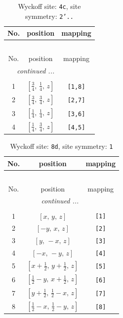 \documentclass[fleqn,8pt]{jsarticle}
\begin{document}
\begin{longtable}{ccc}
\caption{Wyckoff site: {\tt 4c}, site symmetry: {\tt 2'..}}
 \\
 \hline \hline
No. & position & mapping \\ \hline \endfirsthead

\multicolumn{2}{l}{\tablename\ \thetable{}} \\
 \hline \hline
No. & position & mapping \\ \hline \endhead

 \hline \hline
\multicolumn{2}{r}{\footnotesize\it continued ...} \\ \endfoot

 \hline \hline
\multicolumn{2}{r}{} \\ \endlastfoot

1 & $\left[ \frac{3}{4},\, \frac{1}{4},\, z \right]$ & {\tt [1,8]} \\ \hline
2 & $\left[ \frac{3}{4},\, \frac{3}{4},\, z \right]$ & {\tt [2,7]} \\ \hline
3 & $\left[ \frac{1}{4},\, \frac{1}{4},\, z \right]$ & {\tt [3,6]} \\ \hline
4 & $\left[ \frac{1}{4},\, \frac{3}{4},\, z \right]$ & {\tt [4,5]} \\
\end{longtable}
\renewcommand{\arraystretch}{1.2}
\begin{longtable}{ccc}
\caption{Wyckoff site: {\tt 8d}, site symmetry: {\tt 1}}
 \\
 \hline \hline
No. & position & mapping \\ \hline \endfirsthead

\multicolumn{2}{l}{\tablename\ \thetable{}} \\
 \hline \hline
No. & position & mapping \\ \hline \endhead

 \hline \hline
\multicolumn{2}{r}{\footnotesize\it continued ...} \\ \endfoot

 \hline \hline
\multicolumn{2}{r}{} \\ \endlastfoot

1 & $\left[ x,\, y,\, z \right]$ & {\tt [1]} \\ \hline
2 & $\left[ - y,\, x,\, z \right]$ & {\tt [2]} \\ \hline
3 & $\left[ y,\, - x,\, z \right]$ & {\tt [3]} \\ \hline
4 & $\left[ - x,\, - y,\, z \right]$ & {\tt [4]} \\ \hline
5 & $\left[ x + \frac{1}{2},\, y + \frac{1}{2},\, z \right]$ & {\tt [5]} \\ \hline
6 & $\left[ \frac{1}{2} - y,\, x + \frac{1}{2},\, z \right]$ & {\tt [6]} \\ \hline
7 & $\left[ y + \frac{1}{2},\, \frac{1}{2} - x,\, z \right]$ & {\tt [7]} \\ \hline
8 & $\left[ \frac{1}{2} - x,\, \frac{1}{2} - y,\, z \right]$ & {\tt [8]} \\
\end{longtable}
\end{document}
